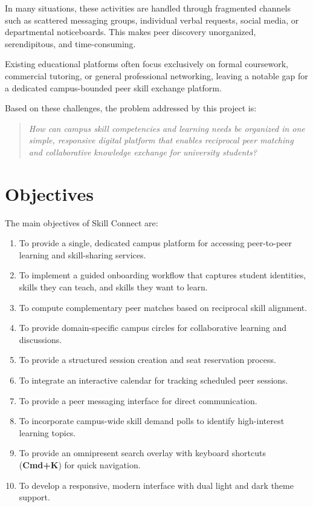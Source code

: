 \documentclass[12pt,a4paper]{report}
\begin{document}
In many situations, these activities are handled through fragmented channels such as scattered messaging groups, individual verbal requests, social media, or departmental noticeboards. This makes peer discovery unorganized, serendipitous, and time-consuming.

Existing educational platforms often focus exclusively on formal coursework, commercial tutoring, or general professional networking, leaving a notable gap for a dedicated campus-bounded peer skill exchange platform.

Based on these challenges, the problem addressed by this project is:
\begin{quote}
\textit{How can campus skill competencies and learning needs be organized in one simple, responsive digital platform that enables reciprocal peer matching and collaborative knowledge exchange for university students?}
\end{quote}

\section{Objectives}
The main objectives of Skill Connect are:
\begin{enumerate}
    \item To provide a single, dedicated campus platform for accessing peer-to-peer learning and skill-sharing services.
    \item To implement a guided onboarding workflow that captures student identities, skills they can teach, and skills they want to learn.
    \item To compute complementary peer matches based on reciprocal skill alignment.
    \item To provide domain-specific campus circles for collaborative learning and discussions.
    \item To provide a structured session creation and seat reservation process.
    \item To integrate an interactive calendar for tracking scheduled peer sessions.
    \item To provide a peer messaging interface for direct communication.
    \item To incorporate campus-wide skill demand polls to identify high-interest learning topics.
    \item To provide an omnipresent search overlay with keyboard shortcuts (\textbf{Cmd+K}) for quick navigation.
    \item To develop a responsive, modern interface with dual light and dark theme support.
\end{enumerate}
\end{document}
